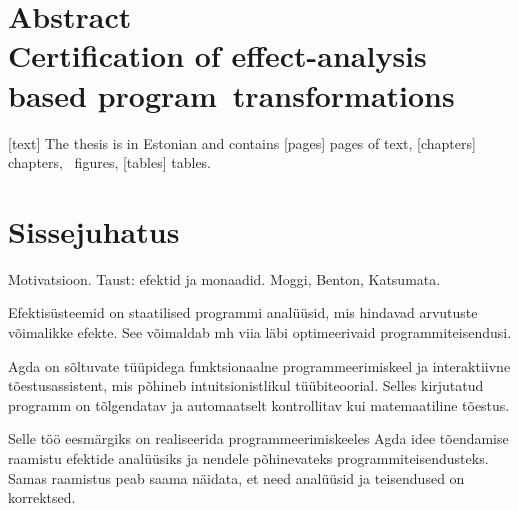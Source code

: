 \documentclass[a4paper,12pt]{article}
\begin{document}
\section*{\vskip 60pt\centering Abstract\\
Certification of effect-analysis based program~transformations}

[text]
The thesis is in Estonian and contains [pages] pages of text, [chapters] chapters, \totalfigures\ figures, [tables] tables.
\clearpage

\tableofcontents
\clearpage

\listoffigures
\clearpage







\section{Sissejuhatus}

Motivatsioon. Taust: efektid ja monaadid. Moggi, Benton, Katsumata.

Efektisüsteemid on staatilised programmi analüüsid, mis hindavad arvutuste võimalikke efekte.
See võimaldab mh viia läbi optimeerivaid programmiteisendusi.




Agda on sõltuvate tüüpidega funktsionaalne programmeerimiskeel ja interaktiivne tõestusassistent,
mis põhineb intuitsionistlikul tüübiteoorial.
Selles kirjutatud programm on tõlgendatav ja automaatselt kontrollitav kui matemaatiline tõestus.

Selle töö eesmärgiks on realiseerida programmeerimiskeeles Agda idee tõendamise
raamistu efektide analüüsiks ja nendele põhinevateks programmiteisendusteks.
Samas raamistus peab saama näidata, et need analüüsid ja teisendused on korrektsed.
\end{document}
